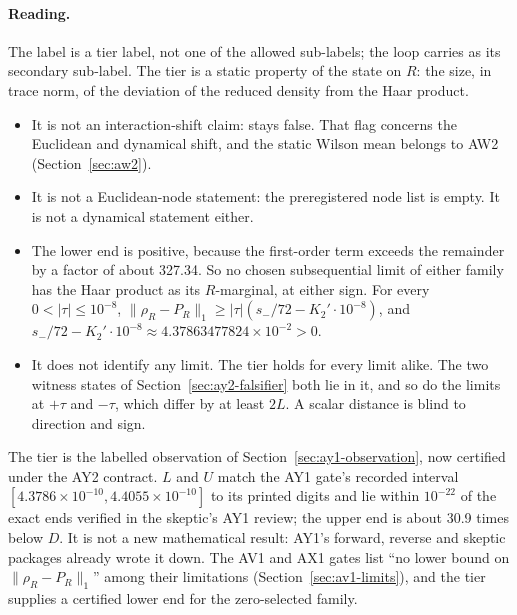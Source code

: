 \paragraph{Reading.}
The label  is a tier label, not one
of the allowed sub-labels; the loop carries  as its
secondary sub-label. The tier is a static property of the state on $R$: the
size, in trace norm, of the deviation of the reduced density from the Haar
product.
\begin{itemize}
\item It is not an interaction-shift claim: 
 stays false. That flag concerns the Euclidean and dynamical shift, and the
 static Wilson mean belongs to AW2 (Section~\ref{sec:aw2}).
\item It is not a Euclidean-node statement: the preregistered node list is
 empty. It is not a dynamical statement either.
\item The lower end is positive, because the first-order term exceeds the
 remainder by a factor of about 327.34. So no chosen subsequential limit of
 either family has the Haar product as its $R$-marginal, at either sign. For
 every $0<|\tau|\le10^{-8}$,
 $\lVert \rho_R-P_R\rVert_1\ge|\tau|(s_-/72-K_2'\cdot10^{-8})$, and
 $s_-/72-K_2'\cdot10^{-8}\approx4.37863477824\times10^{-2}>0$.
\item It does not identify any limit. The tier holds for every limit alike.
 The two witness states of Section~\ref{sec:ay2-falsifier} both lie in it,
 and so do the limits at $+\tau$ and $-\tau$, which differ by at least $2L$.
 A scalar distance is blind to direction and sign.
\end{itemize}
The tier is the labelled observation of Section~\ref{sec:ay1-observation},
now certified under the AY2 contract. $L$ and $U$ match the AY1 gate's
recorded interval $[4.3786\times10^{-10},4.4055\times10^{-10}]$ to its printed
digits and lie within $10^{-22}$ of the exact ends verified in the skeptic's
AY1 review; the upper end is about 30.9 times below $D$. It is not a new
mathematical result: AY1's forward, reverse and skeptic packages already wrote
it down. The AV1 and AX1 gates list ``no lower bound on
$\lVert \rho_R-P_R\rVert_1$'' among their limitations (Section~\ref{sec:av1-limits}),
and the tier supplies a certified lower end for the zero-selected family.

